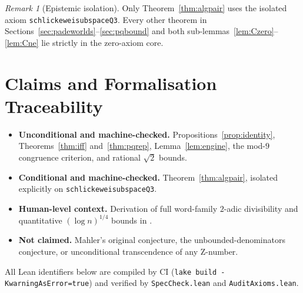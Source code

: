 \documentclass[11pt,a4paper]{article}
\theoremstyle{remark}
\newtheorem{remark}[theorem]{Remark}
\renewcommand{\_}{\textunderscore\allowbreak}
\newcommand{\lean}[1]{\texttt{#1}}
\begin{document}
\begin{remark}[Epistemic isolation]
Only Theorem~\ref{thm:algpair} uses the isolated axiom \lean{schlickewei\_subspace\_Q3}. Every other theorem in Sections~\ref{sec:padeworlds}--\ref{sec:pqbound} and both sub-lemmas~\ref{lem:Czero}--\ref{lem:Cne} lie strictly in the zero-axiom core.
\end{remark}

\section{Claims and Formalisation Traceability}
\label{sec:claims}

\begin{itemize}[leftmargin=1.4em]
  \item \textbf{Unconditional and machine-checked.} Propositions~\ref{prop:identity}, Theorems~\ref{thm:iff} and~\ref{thm:pqrep}, Lemma~\ref{lem:engine}, the mod-$9$ congruence criterion, and rational $\sqrt{2}$ bounds.
  \item \textbf{Conditional and machine-checked.} Theorem~\ref{thm:algpair}, isolated explicitly on \lean{schlickewei\_subspace\_Q3}.
  \item \textbf{Human-level context.} Derivation of full word-family $2$-adic divisibility and quantitative $(\log n)^{1/4}$ bounds in \citep{stephan2026subspace}.
  \item \textbf{Not claimed.} Mahler's original conjecture, the unbounded-denominators conjecture, or unconditional transcendence of any Z-number.
\end{itemize}

All Lean identifiers below are compiled by CI (\lean{lake build -KwarningAsError=true}) and verified by \lean{SpecCheck.lean} and \lean{AuditAxioms.lean}.
\end{document}
